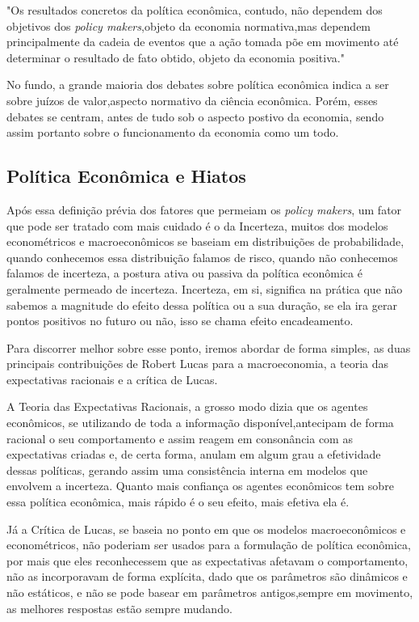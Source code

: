\begin{citacao}
 "Os resultados concretos da política econômica, contudo, não dependem dos objetivos dos \emph{policy makers},objeto da economia normativa,mas dependem principalmente da cadeia de eventos que a ação tomada põe em movimento até determinar o resultado de
fato obtido, objeto da economia positiva." \cite{MarcioGarcia}
\end{citacao}

No fundo, a grande maioria dos debates sobre política econômica indica a ser sobre juízos de valor,aspecto normativo da ciência econômica. Porém, esses debates se centram, antes de tudo sob o aspecto postivo da economia, sendo assim portanto sobre o funcionamento da economia como um todo.
 
\subsection*{Política Econômica e Hiatos} 
Após essa definição prévia dos fatores que permeiam os \emph{policy makers}, um fator que pode ser tratado com mais cuidado é o da Incerteza, muitos dos modelos econométricos e macroeconômicos se baseiam em distribuições de probabilidade, quando conhecemos essa distribuição falamos de risco, quando não conhecemos falamos de incerteza, a postura ativa ou passiva da política econômica é geralmente permeado de incerteza. Incerteza, em si, significa  na prática que não sabemos a magnitude do efeito dessa política ou a sua duração, se ela ira gerar pontos positivos no futuro ou não, isso se chama efeito encadeamento. 

Para discorrer melhor sobre esse ponto, iremos abordar de forma simples, as duas principais contribuições de Robert Lucas para a macroeconomia, a teoria das expectativas racionais e a crítica de Lucas.

A Teoria das Expectativas Racionais, a grosso modo dizia que os agentes econômicos, se utilizando de toda a informação disponível,antecipam de forma racional o seu comportamento e assim reagem em consonância com as expectativas criadas e, de certa forma, anulam em algum grau a efetividade dessas políticas, gerando assim uma consistência interna em modelos que envolvem a incerteza. Quanto mais confiança os agentes econômicos tem sobre essa política econômica, mais rápido é o seu efeito, mais efetiva ela é. 

Já a Crítica de Lucas, se baseia no ponto em que os modelos macroeconômicos e econométricos, não poderiam ser usados para a formulação de política econômica, por mais que eles reconhecessem que as expectativas afetavam o comportamento, não as incorporavam de forma explícita, dado que os parâmetros são dinâmicos e não estáticos, e não se pode basear em parâmetros antigos,sempre em movimento, as melhores respostas estão sempre mudando. 

